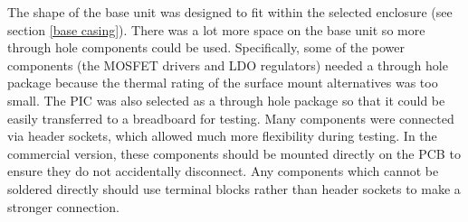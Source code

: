 The shape of the base unit was designed to fit within the selected enclosure (see section \ref{base casing}). There was a lot more space on the base unit so more through hole components could be used. Specifically, some of the power components (the MOSFET drivers and LDO regulators) needed a through hole package because the thermal rating of the surface mount alternatives was too small. The PIC was also selected as a through hole package so that it could be easily transferred to a breadboard for testing. Many components were connected via header sockets, which allowed much more flexibility during testing. In the commercial version, these components should be mounted directly on the PCB to ensure they do not accidentally disconnect. Any components which cannot be soldered directly should use terminal blocks rather than header sockets to make a stronger connection.\\